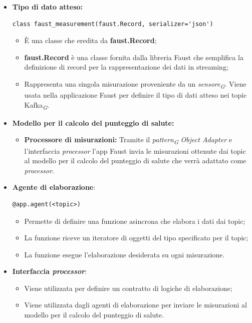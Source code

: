 \begin{itemize}
    \item \textbf{Tipo di dato atteso:}
     \begin{lstlisting}[style=code]
    class faust_measurement(faust.Record, serializer='json')
    \end{lstlisting}  
    \begin{itemize}
        \item È una classe che eredita da \textbf{faust.Record};
        \item \textbf{faust.Record} è una classe fornita dalla libreria Faust che semplifica la definizione di record per la rappresentazione dei dati in streaming;
        \item Rappresenta una singola misurazione proveniente da un \textit{sensore}\textsubscript{\textit{G}}. Viene usata nella applicazione Faust per definire il tipo di dati atteso nei topic Kafka\textsubscript{\textit{G}}.
    \end{itemize}

    \item \textbf{Modello per il calcolo del punteggio di salute:}
    \begin{itemize}
        \item \textbf{Processore di misurazioni:}
        Tramite il \textit{pattern}\textsubscript{\textit{G}} \textit{Object Adapter} e l'interfaccia \textit{processor} l'app Faust invia le misurazioni ottenute dai topic al modello per il calcolo del punteggio di salute che verrà adattato come \textit{processor}.
    \end{itemize}

    \item \textbf{Agente di elaborazione}: 
    \begin{lstlisting}[style=code]
    @app.agent(<topic>)
    \end{lstlisting}  
    \begin{itemize}
        \item Permette di definire una funzione asincrona che elabora i dati dai topic;
        \item La funzione riceve un iteratore di oggetti del tipo specificato per il topic;
        \item La funzione esegue l'elaborazione desiderata su ogni misurazione.
    \end{itemize}

    \item \textbf{Interfaccia \textit{processor}}:
    \begin{itemize}
        \item Viene utilizzata per definire un contratto di logiche di elaborazione;
        \item Viene utilizzata dagli agenti di elaborazione per inviare le misurazioni al modello per il calcolo del punteggio di salute.
    \end{itemize}


\end{itemize}
